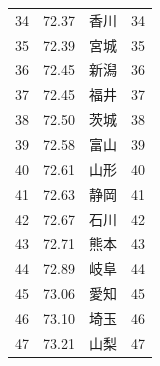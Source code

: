 \begin{table}[ht]
\begin{tabular}{rrlr}
  34 & 72.37 & 香川 &  34 \\ 
  35 & 72.39 & 宮城 &  35 \\ 
  36 & 72.45 & 新潟 &  36 \\ 
  37 & 72.45 & 福井 &  37 \\ 
  38 & 72.50 & 茨城 &  38 \\ 
  39 & 72.58 & 富山 &  39 \\ 
  40 & 72.61 & 山形 &  40 \\ 
  41 & 72.63 & 静岡 &  41 \\ 
  42 & 72.67 & 石川 &  42 \\ 
  43 & 72.71 & 熊本 &  43 \\ 
  44 & 72.89 & 岐阜 &  44 \\ 
  45 & 73.06 & 愛知 &  45 \\ 
  46 & 73.10 & 埼玉 &  46 \\ 
  47 & 73.21 & 山梨 &  47 \\ 
   \hline
\end{tabular}
\end{table}





